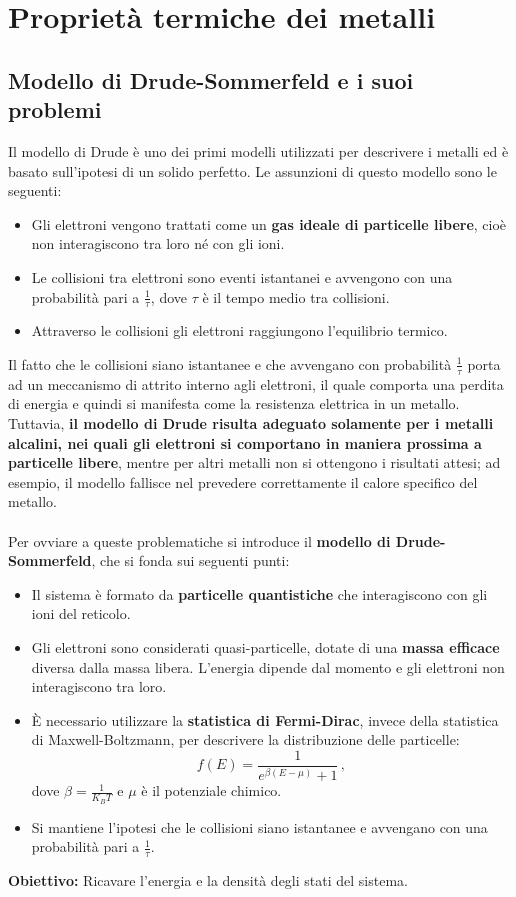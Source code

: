 \chapter{Proprietà termiche dei metalli}
\section{Modello di Drude-Sommerfeld e i suoi problemi}
Il modello di Drude è uno dei primi modelli utilizzati per descrivere i metalli ed è basato sull'ipotesi di un solido perfetto. Le assunzioni di questo modello sono le seguenti:
\begin{itemize}
	\item Gli elettroni vengono trattati come un \textbf{gas ideale di particelle libere}, cioè non interagiscono tra loro né con gli ioni.
	\item Le collisioni tra elettroni sono eventi istantanei e avvengono con una probabilità pari a $\frac{1}{\tau}$, dove $\tau$ è il tempo medio tra collisioni.
	\item Attraverso le collisioni gli elettroni raggiungono l'equilibrio termico.
\end{itemize}
Il fatto che le collisioni siano istantanee e che avvengano con probabilità $\frac{1}{\tau}$ porta ad un meccanismo di attrito interno agli elettroni, il quale comporta una perdita di energia e quindi si manifesta come la resistenza elettrica in un metallo.\\
Tuttavia, \textbf{il modello di Drude risulta adeguato solamente per i metalli alcalini, nei quali gli elettroni si comportano in maniera prossima a particelle libere}, mentre per altri metalli non si ottengono i risultati attesi; ad esempio, il modello fallisce nel prevedere correttamente il calore specifico del metallo.\\\\
Per ovviare a queste problematiche si introduce il \textbf{modello di Drude-Sommerfeld}, che si fonda sui seguenti punti:
\begin{itemize}
	\item Il sistema è formato da \textbf{particelle quantistiche} che interagiscono con gli ioni del reticolo.
	\item Gli elettroni sono considerati quasi-particelle, dotate di una \textbf{massa efficace} diversa dalla massa libera. L'energia dipende dal momento e gli elettroni non interagiscono tra loro.
	\item È necessario utilizzare la \textbf{statistica di Fermi-Dirac}, invece della statistica di Maxwell-Boltzmann, per descrivere la distribuzione delle particelle:
	\[
	f(E)= \frac{1}{e^{\beta (E-\mu)}+1}\,,
	\]
	dove $\beta=\frac{1}{K_B T}$ e $\mu$ è il potenziale chimico.
	\item Si mantiene l'ipotesi che le collisioni siano istantanee e avvengano con una probabilità pari a $\frac{1}{\tau}$.
\end{itemize}
\bigskip
\textbf{Obiettivo:} Ricavare l'energia e la densità degli stati del sistema.

